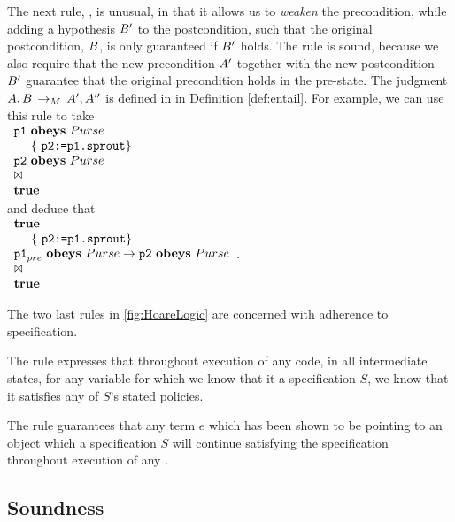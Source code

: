 

 The next rule,   , is unusual, in that it allows us to {\em weaken} the precondition, while adding a hypothesis $B'$ to the postcondition, such that the original postcondition, $B$, is only guaranteed if $B'$ holds. The rule is sound, because we also require that the new precondition $A'$ together with the new postcondition $B'$ guarantee that the original precondition holds in the pre-state.
The judgment $A,B\, \rightarrow_{M}\, A',A''$ is defined in  in Definition \ref{def:entail}.
For example, we can use this rule to take\\
$\begin{array}{l} {\ensuremath{\textrm{\ttfamily{p1}}}}\, \,\textbf{\textrm{obeys}}\,\, Purse\\ ~ { ~ } {\hspace{.1in}} \{\ {\textrm{\ttfamily{p2:=p1.sprout}}} \} \\ {\textrm{\ttfamily{p2}}}\, \,\textbf{\textrm{obeys}}\,\, Purse \\ \Join\\ {\bf {true}} \end{array} $\\ and deduce that\\
$\begin{array}{l} {\bf {true}}\\ ~ { ~ } {\hspace{.1in}} \{\ {\textrm{\ttfamily{p2:=p1.sprout}}} \} \\ {\textrm{\ttfamily{p1}}}_{{pre}}\, \,\textbf{\textrm{obeys}}\,\, Purse \rightarrow {\ensuremath{\textrm{\ttfamily{p2}}}}\, \,\textbf{\textrm{obeys}}\,\, Purse \\ \Join\\ {\bf {true}} \end{array} $.





The two last rules in \ref{fig:HoareLogic} are concerned with adherence to specification.

The rule  expresses that throughout execution of any code, in all intermediate states, for any variable  for which we know that it \obeys a specification $S$, we know that it satisfies any of $S$'s stated policies.

The rule  guarantees that any term $e$ which has been shown to be pointing to an object which \obeys a specification $S$ will continue satisfying the specification throughout execution of any .


\subsection{Soundness}

